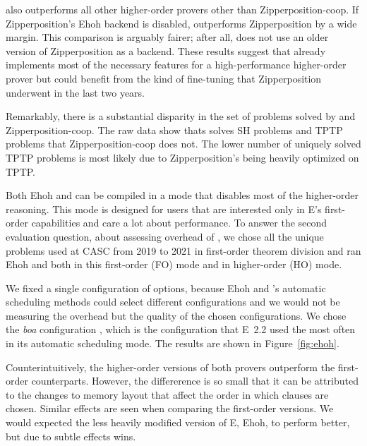\ehohii{} also outperforms all other higher-order provers other than Zipperposition-coop.
If Zipperposition's Ehoh backend is disabled,
\ehohii{} outperforms Zipperposition by a wide margin.
This comparison is arguably fairer; after all,
\ehohii{} does not use an older version of Zipperposition
as a backend.
%
These results suggest that \ehohii{} already implements most of the necessary features
for a high-performance higher-order prover
but could benefit from the kind of fine-tuning that
Zipperposition underwent in the last two years.

Remarkably, there is a substantial disparity in the set of problems solved by
\ehohii{} and Zipperposition-coop. The raw data show thats \ehohii{} solves
 SH problems and  TPTP problems that Zipperposition-coop
does not. The lower number of uniquely solved TPTP problems is most likely 
due to Zipperposition's being heavily optimized on TPTP.

 Both Ehoh and \ehohii{} can be compiled
in a mode that disables most of the higher-order reasoning. This mode is
designed for users that are interested only in E's first-order capabilities and
care a lot about performance.
To answer the second
evaluation question, about assessing overhead of \ehohii{},
we chose all the  unique problems used at CASC
from 2019 to 2021 in first-order theorem division and ran Ehoh and \ehohii{}
both in this first-order (FO) mode and in higher-order (HO) mode.

We fixed a single
configuration of options, because Ehoh and \ehohii{}'s
automatic scheduling methods could select different configurations
and we would not be measuring the overhead but the quality of the chosen
configurations. We chose the \emph{boa} configuration
\cite[Sect.~7]{section-ehoh},
which is the configuration that E~2.2 used the most often in its automatic scheduling mode.
The results are shown in Figure~\ref{fig:ehoh}.

Counterintuitively, the higher-order versions of both provers outperform
the first-order counterparts. However, the differerence is so small that it can
be attributed to the changes to memory layout that affect the order in which
clauses are chosen. Similar effects are seen when comparing the first-order versions.
We would expected the less heavily modified version of E, Ehoh, to perform better,
but due to subtle effects \ehohii{} wins.


